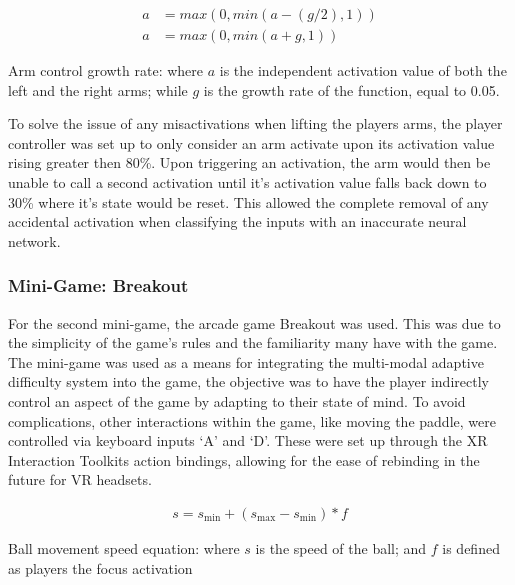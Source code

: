 \documentclass[11pt, a4paper]{article}
\begin{document}
\begin{equ}[H]
	\large
	\centering
	\begin{align}
		a & = max(0,min(a - (g / 2),1)) 	\nonumber 	\\
		a & = max(0,min(a + g,1)) 
		\label{equation:arm_activation}
	\end{align}
	\captionsetup{font = small, labelfont = small, labelformat = empty, width = .8\linewidth}
	\caption{Arm control growth rate: where \(a\) is the independent activation value of both the left and the right arms; while \(g\) is the growth rate of the function, equal to 0.05.}
\end{equ}


To solve the issue of any misactivations when lifting the players arms, the player controller was set up to only consider an arm activate upon its activation value rising greater then 80\%. Upon triggering an activation, the arm would then be unable to call a second activation until it's activation value falls back down to 30\% where it's state would be reset. This allowed the complete removal of any accidental activation when classifying the inputs with an inaccurate neural network.



\subsubsection{Mini-Game: Breakout}

For the second mini-game, the arcade game Breakout was used. This was due to the simplicity of the game's rules and the familiarity many have with the game. The mini-game was used as a means for integrating the multi-modal adaptive difficulty system into the game, the objective was to have the player indirectly control an aspect of the game by adapting to their state of mind. To avoid complications, other interactions within the game, like moving the paddle, were controlled via keyboard inputs `A' and `D'. These were set up through the XR Interaction Toolkits action bindings, allowing for the ease of rebinding in the future for VR headsets.

\begin{equ}[H]
	\Large
	\centering
	\begin{align}
		s = s_\mathrm{min} + (s_\mathrm{max} - s_\mathrm{min}) * f
		\label{equation:ball_movement_speed}
	\end{align}
	\captionsetup{font = small, labelfont = small, labelformat = empty, width = .8\linewidth}
	\caption{Ball movement speed equation: where \(s\) is the speed of the ball; and \(f\) is defined as players the focus activation}
\end{equ}
\end{document}
